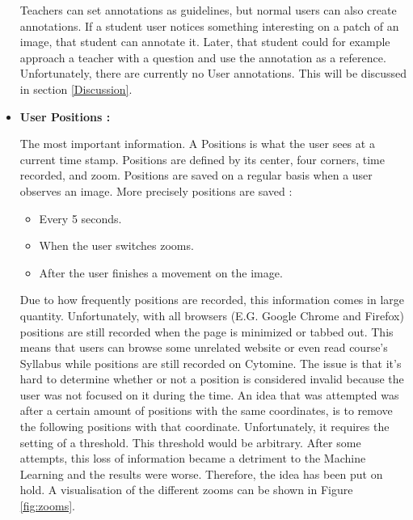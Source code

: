 \documentclass[a4paper,11pt]{report}
\numberwithin{figure}{section} %
\begin{document}
\begin{itemize}
        Teachers can set annotations as guidelines, but normal users can also create annotations.
        If a student user notices something interesting on a patch of an image, that student can annotate it.
        Later, that student could for example approach a teacher with a question and use the annotation as a reference.
        Unfortunately, there are currently no User annotations.
        This will be discussed in section \ref{Discussion}.\\
        
        \item[\textbullet]  \textbf{User Positions :}\newline
        
         The most important information.
         A Positions is what the user sees at a current time stamp.
         Positions are defined by its center, four corners, time recorded, and zoom.
         Positions are saved on a regular basis when a user observes an image.
         More precisely positions are saved :
         \begin{itemize}
         	\item[\textbullet] Every 5 seconds.
            \item[\textbullet] When the user switches zooms.
            \item[\textbullet] After the user finishes a movement on the image.
         \end{itemize}
         Due to how frequently positions are recorded, this information comes in large quantity.
         Unfortunately, with all browsers (E.G. Google Chrome and Firefox) positions are still recorded when the page is minimized or tabbed out.
         This means that users can browse some unrelated website or even read course's Syllabus while positions are still recorded on Cytomine.
         The issue is that it's hard to determine whether or not a position is considered invalid because the user was not focused on it during the time.
         An idea that was attempted was after a certain amount of positions with the same coordinates, is to remove the following positions with that coordinate.
         Unfortunately, it requires the setting of a threshold.
         This threshold would be arbitrary.
         After some attempts, this loss of information became a detriment to the Machine Learning and the results were worse.
         Therefore, the idea has been put on hold.
         A visualisation of the different zooms can be shown in Figure \ref{fig:zooms}.\\



\end{itemize}
\end{document}

